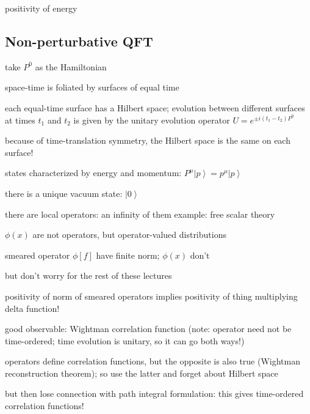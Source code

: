 \documentclass[a4paper,12pt]{article}
\newcommand{\ket}[1]{\left| #1 \right\rangle}
\numberwithin{equation}{section}
\begin{document}
positivity of energy 

\subsection{Non-perturbative QFT}


take $P^0$ as the Hamiltonian

space-time is foliated by surfaces of equal time

each equal-time surface has a Hilbert space; evolution between different surfaces at times $t_1$ and $t_2$ is given by the unitary evolution operator $U = e^{\pm i (t_1 - t_2) P^0}$

because of time-translation symmetry, the Hilbert space is the same on each surface!

states characterized by energy and momentum: $P^\mu \ket{p} = p^\mu \ket{p}$

there is a unique vacuum state: $\ket{0}$

there are local operators: an infinity of them
example: free scalar theory



$\phi(x)$ are not operators, but operator-valued distributions

smeared operator $\phi[f]$ have finite norm; $\phi(x)$ don't

but don't worry for the rest of these lectures


positivity of norm of smeared operators implies positivity of thing multiplying delta function!




good observable: Wightman correlation function
(note: operator need not be time-ordered; time evolution is unitary, so it can go both ways!)

operators define correlation functions, but the opposite is also true (Wightman reconstruction theorem); so use the latter and forget about Hilbert space



but then lose connection with path integral formulation: this gives time-ordered correlation functions!
\end{document}
